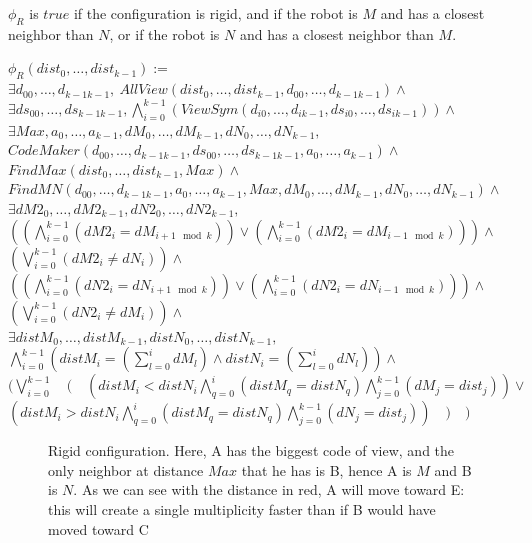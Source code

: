 \documentclass{article}
\begin{document}
$\phi_R$ is $true$ if the configuration is rigid, and if the robot is $M$ and has a closest neighbor than $N$, or if the robot is $N$ and has a closest neighbor than $M$.

\begin{center}

$\phi_R (dist_{0}, \ldots ,dist_{k-1}):=$\\
$\exists d_{00}, \ldots ,d_{k-1k-1},\ AllView (dist_{0}, \ldots ,dist_{k-1}, d_{00}, \ldots ,d_{k-1k-1})\land$\\
$\exists ds_{00}, \ldots ,ds_{k-1k-1}, \bigwedge_{i=0}^{k-1}  (ViewSym (d_{i0}, \ldots , d_{ik-1}, ds_{i0}, \ldots , ds_{ik-1}))\land$\\
$\exists Max, a_{0}, \ldots , a_{k-1}, dM_{0}, \dots, dM_{k-1}, dN_{0}, \dots, dN_{k-1},$\\
$CodeMaker (d_{00}, \ldots ,d_{k-1k-1}, ds_{00}, \ldots ,ds_{k-1k-1}, a_{0}, \ldots , a_{k-1})\land$\\
$FindMax (dist_{0}, \ldots ,dist_{k-1}, Max) \land$\\
$FindMN (d_{00}, \ldots ,d_{k-1k-1}, a_{0}, \ldots , a_{k-1}, Max,  dM_{0}, \dots, dM_{k-1}, dN_{0}, \dots, dN_{k-1}) \land $\\
$\exists dM2_{0}, \dots, dM2_{k-1}, dN2_{0}, \dots, dN2_{k-1},$\\
$ (  (\bigwedge_{i = 0}^{k-1}  (dM2_{i} = dM_{i+1 \mod{k}}) ) \lor  (\bigwedge_{i = 0}^{k-1}  (dM2_{i} = dM_{i-1 \mod{k}})) ) \land$\\
$ (\bigvee_{i = 0}^{k-1}  (dM2_{i} \not= dN_{i}) ) \land $\\
$ (  (\bigwedge_{i = 0}^{k-1}  (dN2_{i} = dN_{i+1 \mod{k}}) ) \lor  (\bigwedge_{i = 0}^{k-1}  (dN2_{i} = dN_{i-1 \mod{k}})) ) \land$\\
$ (\bigvee_{i = 0}^{k-1}  (dN2_{i} \not= dM_{i}) ) \land $\\

$\exists distM_{0}, \ldots , distM_{k-1}, distN_{0}, \ldots , distN_{k-1},$\\
$\bigwedge_{i=0}^{k-1} (distM_{i} =  (\sum_{l=0}^i dM_{l}) \land distN_{i} =  (\sum_{l=0}^i dN_{l}) ) \land $\\
$ (\bigvee_{i=0}^{k-1}\quad  (\quad  (distM_{i} < distN_{i} \bigwedge_{q=0}^{i}  (distM_{q} = distN_{q}) \bigwedge_{j = 0}^{k-1}  (dM_{j} = dist_{j}) ) \lor $\\
$ (distM_{i} > distN_{i} \bigwedge_{q=0}^{i}  (distM_{q} = distN_{q}) \bigwedge_{j = 0}^{k-1}  (dN_{j} = dist_{j}) )\quad )\quad )$
\end{center}
\newpage
\begin{figure}[!hp]
    \centering
    \def\svgscale{0.3}
    
    \caption{Rigid configuration. Here, A has the biggest code of view, and the only neighbor at distance $Max$ that he has is B, hence A is $M$ and B is $N$. As we can see with the distance in red, A will move toward E: this will create a single multiplicity faster than if B would have moved toward C}
    \label{dessinRigid}
\end{figure}
\end{document}
